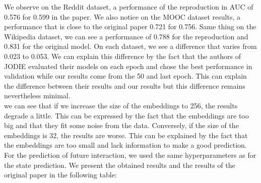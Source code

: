 We observe on the Reddit dataset, a performance of the reproduction in AUC of 0.576 for 0.599 in the paper. We also notice on the MOOC dataset results, a performance that is close to the original paper 0.721 for 0.756. Same thing on the Wikipedia dataset, we can see a performance of 0.788 for the reproduction and 0.831 for the original model. On each dataset, we see a difference that varies from 0.023 to 0.053. We can explain this difference by the fact that the authors of JODIE evaluated their models on each epoch and chose the best performance in validation while our results come from the 50 and last epoch. This can explain the difference between their results and our results but this difference remains nevertheless minimal.\\
we can see that if we increase the size of the embeddings to 256, the results degrade a little. This can be expressed by the fact that the embeddings are too big and that they fit some noise from the data. Conversely, if the size of the embeddings is 32, the results are worse. This can be explained by the fact that the embeddings are too small and lack information to make a good prediction.\\

For the prediction of future interaction, we used the same hyperparameters as for the state prediction. We present the obtained results and the results of the original paper in the following table:



